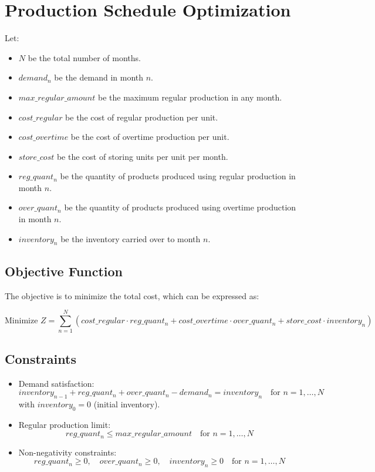 \documentclass{article}
\begin{document}
\section*{Production Schedule Optimization}

Let:
\begin{itemize}
    \item $N$ be the total number of months.
    \item $demand_n$ be the demand in month $n$.
    \item $max\_regular\_amount$ be the maximum regular production in any month.
    \item $cost\_regular$ be the cost of regular production per unit.
    \item $cost\_overtime$ be the cost of overtime production per unit.
    \item $store\_cost$ be the cost of storing units per unit per month.
    \item $reg\_quant_n$ be the quantity of products produced using regular production in month $n$.
    \item $over\_quant_n$ be the quantity of products produced using overtime production in month $n$.
    \item $inventory_n$ be the inventory carried over to month $n$.
\end{itemize}

\subsection*{Objective Function}

The objective is to minimize the total cost, which can be expressed as:

\[
\text{Minimize } Z = \sum_{n=1}^{N} \left( cost\_regular \cdot reg\_quant_n + cost\_overtime \cdot over\_quant_n + store\_cost \cdot inventory_n \right)
\]

\subsection*{Constraints}

\begin{itemize}
    \item Demand satisfaction:
    \[
    inventory_{n-1} + reg\_quant_n + over\_quant_n - demand_n = inventory_n \quad \text{for } n=1,\ldots,N
    \]
    with $inventory_0 = 0$ (initial inventory).

    \item Regular production limit:
    \[
    reg\_quant_n \leq max\_regular\_amount \quad \text{for } n=1,\ldots,N
    \]

    \item Non-negativity constraints:
    \[
    reg\_quant_n \geq 0, \quad over\_quant_n \geq 0, \quad inventory_n \geq 0 \quad \text{for } n=1,\ldots,N
    \]
\end{itemize}
\end{document}
